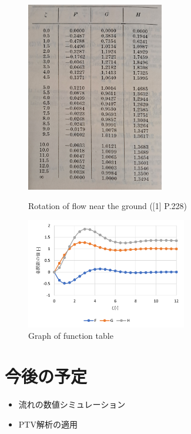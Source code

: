 \documentclass[twocolumn,a4j]{jsarticle}
\begin{document}
\begin{figure}[htbp]
  \footnotesize
  \begin{center}
    \includegraphics[width=60mm]{../images/function_table.jpg}
    \caption{Rotation of flow near the ground ([1] P.228)}
    \includegraphics[width=70mm]{../images/function_graph.png}
    \caption{Graph of function table}
  \end{center}
\end{figure}

\section{今後の予定}
\begin{itemize}
  \item 流れの数値シミュレーション
  \item PTV解析の適用
\end{itemize}
\end{document}
